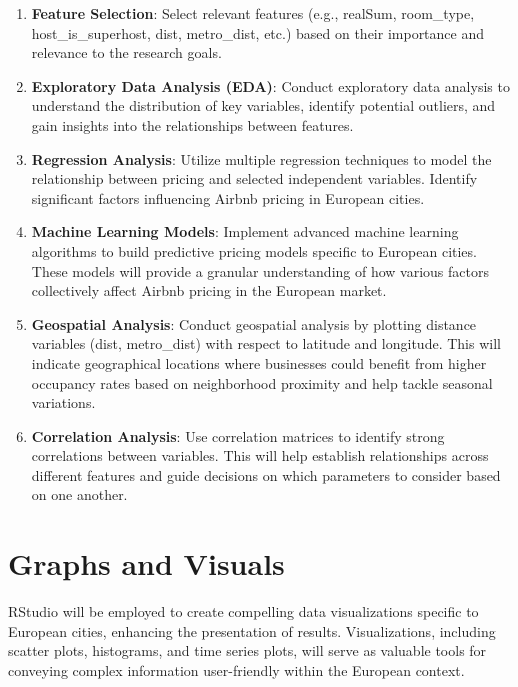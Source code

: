 \documentclass[12pt, letterpaper]{article}
\begin{document}
\begin{enumerate}
  \item \textbf{Feature Selection}: Select relevant features (e.g., realSum, room\_type, host\_is\_superhost, dist, metro\_dist, etc.) based on their importance and relevance to the research goals.
  \item \textbf{Exploratory Data Analysis (EDA)}: Conduct exploratory data analysis to understand the distribution of key variables, identify potential outliers, and gain insights into the relationships between features.
  \item \textbf{Regression Analysis}: Utilize multiple regression techniques to model the relationship between pricing and selected independent variables. Identify significant factors influencing Airbnb pricing in European cities.
  \item \textbf{Machine Learning Models}: Implement advanced machine learning algorithms to build predictive pricing models specific to European cities. These models will provide a granular understanding of how various factors collectively affect Airbnb pricing in the European market.
  \item \textbf{Geospatial Analysis}: Conduct geospatial analysis by plotting distance variables (dist, metro\_dist) with respect to latitude and longitude. This will indicate geographical locations where businesses could benefit from higher occupancy rates based on neighborhood proximity and help tackle seasonal variations.
  \item \textbf{Correlation Analysis}: Use correlation matrices to identify strong correlations between variables. This will help establish relationships across different features and guide decisions on which parameters to consider based on one another.
\end{enumerate}

\section*{Graphs and Visuals}
RStudio will be employed to create compelling data visualizations specific to European cities, enhancing the presentation of results. Visualizations, including scatter plots, histograms, and time series plots, will serve as valuable tools for conveying complex information user-friendly within the European context.
\end{document}
